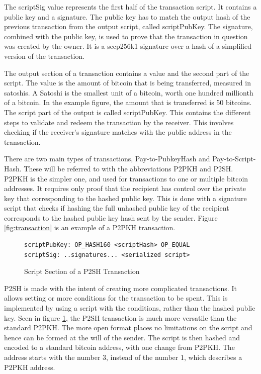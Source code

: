 \documentclass[12pt]{article}
\begin{document}
The scriptSig value represents the first half of the transaction script. It contains a public key and a signature. The public key has to match the output hash of the previous transaction from the output script, called scriptPubKey. The signature, combined with the public key, is used to prove that the transaction in question was created by the owner. It is a secp256k1 signature over a hash of a simplified version of the transaction. 

The output section of a transaction contains a value and the second part of the script. The value is the amount of bitcoin that is being transferred, measured in satoshis. A Satoshi is the smallest unit of a bitcoin, worth one hundred millionth of a bitcoin. In the example figure, the amount that is transferred is 50 bitcoins. The script part of the output is called scriptPubKey. This contains the different steps to validate and redeem the transaction by the receiver. This involves checking if the receiver's signature matches with the public address in the transaction. 

There are two main types of transactions, Pay-to-PubkeyHash and Pay-to-Script-Hash. These will be referred to with the abbreviations P2PKH and P2SH. P2PKH is the simpler one, and used for transactions to one or multiple bitcoin addresses. It requires only proof that the recipient has control over the private key that corresponding to the hashed public key. This is done with a signature script that checks if hashing the full unhashed public key of the recipient corresponds to the hashed public key hash sent by the sender. Figure \ref{fig:transaction} is an example of a P2PKH transaction. 

\begin{figure}[h!]
\begin{lstlisting}[numbers=none]
scriptPubKey: OP_HASH160 <scriptHash> OP_EQUAL 
scriptSig: ..signatures... <serialized script>
 \end{lstlisting}
 \caption{Script Section of a P2SH Transaction}
 \label{fig:transaction2}
\end{figure}

P2SH is made with the intent of creating more complicated transactions. It allows setting or more conditions for the transaction to be spent. This is implemented by using a script with the conditions, rather than the hashed public key. Seen in figure \ref{fig:transaction2}, the P2SH transaction is much more versatile than the standard P2PKH. The more open format places no limitations on the script and hence can be formed at the will of the sender. The script is then hashed and encoded to a standard bitcoin address, with one change from P2PKH. The address starts with the number 3, instead of the number 1, which describes a P2PKH address. 
\end{document}
